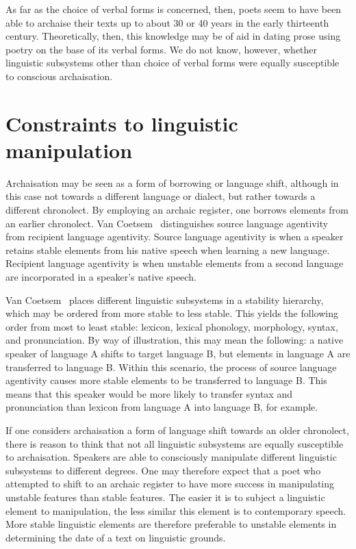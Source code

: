 As far as the choice of verbal forms  is concerned, then, poets seem to have been able to archaise their texts up to about 30 or 40 years in the early thirteenth century. Theoretically, then, this knowledge may be of aid in dating prose using poetry on the base of its verbal forms. We do not know, however, whether linguistic subsystems other than choice of verbal forms were equally susceptible to conscious archaisation.
\section{Constraints to linguistic manipulation}
Archaisation may be seen as a form of borrowing or language shift, although in this case not towards a different language or dialect, but rather towards a different chronolect. By employing an archaic register, one borrows elements from an earlier chronolect. Van Coetsem~\parencite*{van_coetsem_loan_1988} distinguishes source language agentivity from recipient language agentivity. Source language agentivity is when a speaker retains stable elements from his native speech when learning a new language. Recipient language agentivity is when unstable elements from a second language are incorporated in a speaker’s native speech. 

Van Coetsem~\parencite*{van_coetsem_loan_1988} places different linguistic subsystems in a stability hierarchy, which may be ordered from more stable to less stable. This yields the following order from most to least stable: lexicon, lexical phonology, morphology, syntax, and pronunciation. By way of illustration, this may mean the following: a native speaker of language A shifts to target language B, but elements in language A are transferred to language B. Within this scenario, the process of source language agentivity causes more stable elements to be transferred to language B. This means that this speaker would be more likely to transfer syntax and pronunciation than lexicon from language A into language B, for example.

If one considers archaisation a form of language shift towards an older chronolect, there is reason to think that not all linguistic subsystems are equally susceptible to archaisation. Speakers are able to consciously manipulate different linguistic subsystems to different degrees. One may therefore expect that a poet who attempted to shift to an archaic register to have more success in manipulating unstable features than stable features. The easier it is to subject a linguistic element to manipulation, the less similar this element is to contemporary speech. More stable linguistic elements are therefore preferable to unstable elements in determining the date of a text on linguistic grounds.  


